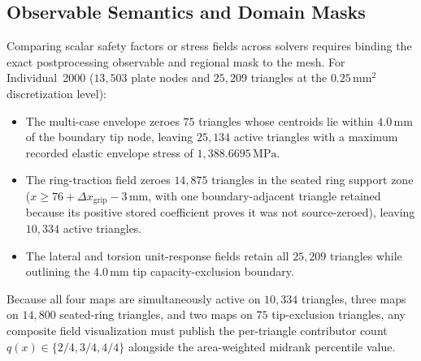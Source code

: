 \subsection{Observable Semantics and Domain Masks}
Comparing scalar safety factors or stress fields across solvers requires binding the exact postprocessing observable and regional mask to the mesh. For Individual~2000 ($13{,}503$ plate nodes and $25{,}209$ triangles at the $0.25\,\mathrm{mm}^2$ discretization level):
\begin{itemize}[leftmargin=*,nosep]
\item The multi-case envelope zeroes $75$ triangles whose centroids lie within $4.0\,\mathrm{mm}$ of the boundary tip node, leaving $25{,}134$ active triangles with a maximum recorded elastic envelope stress of $1{,}388.6695\,\mathrm{MPa}$.
\item The ring-traction field zeroes $14{,}875$ triangles in the seated ring support zone ($x \ge 76 + \Delta x_{\text{grip}} - 3\,\mathrm{mm}$, with one boundary-adjacent triangle retained because its positive stored coefficient proves it was not source-zeroed), leaving $10{,}334$ active triangles.
\item The lateral and torsion unit-response fields retain all $25{,}209$ triangles while outlining the $4.0\,\mathrm{mm}$ tip capacity-exclusion boundary.
\end{itemize}
Because all four maps are simultaneously active on $10{,}334$ triangles, three maps on $14{,}800$ seated-ring triangles, and two maps on $75$ tip-exclusion triangles, any composite field visualization must publish the per-triangle contributor count $q(x) \in \{2/4, 3/4, 4/4\}$ alongside the area-weighted midrank percentile value.

